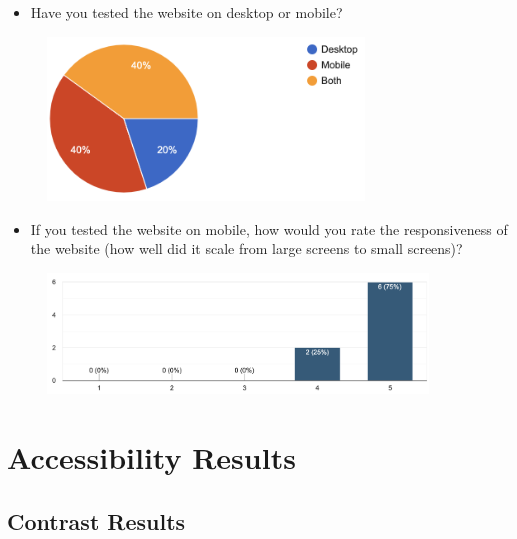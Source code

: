 \documentclass[letterpaper,12pt]{article}
\begin{document}
\begin{appendices}
\begin{itemize}
    \item Have you tested the website on desktop or mobile?
\end{itemize}

\begin{figure}[h] 
\centerline{\includegraphics[width=0.75\textwidth]{report/images/user-survey-device.png}}
{\label{fig:user-survey-device}}
\end{figure}

\begin{itemize}
    \item If you tested the website on mobile, how would you rate the responsiveness of the website (how well did it scale from large screens to small screens)?
\end{itemize}

\begin{figure}[h] 
\centerline{\includegraphics[width=0.9\textwidth]{report/images/user-survey-responsiveness.png}}
{\label{fig:user-survey-responsiveness}}
\end{figure}

\clearpage
\section{Accessibility Results}
\label{sec:appendix-accessibility-results}

\subsection{Contrast Results}
\label{sec:appendix-accessibility-results-contrast}


\end{appendices}
\end{document}
